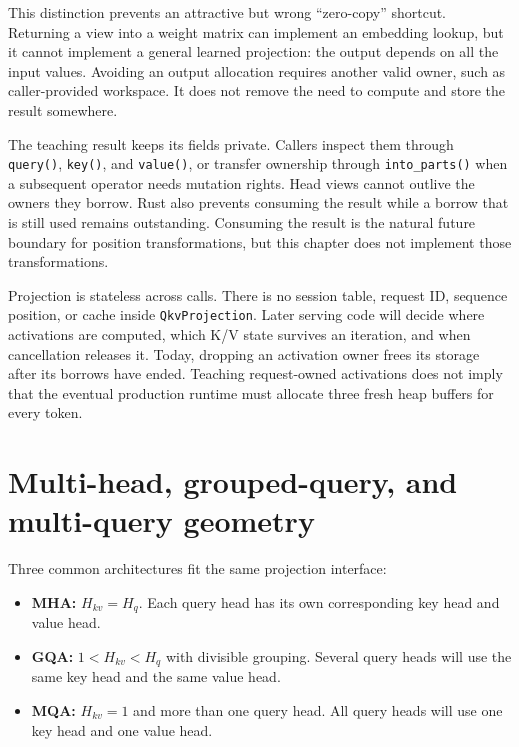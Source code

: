 This distinction prevents an attractive but wrong ``zero-copy''
shortcut. Returning a view into a weight matrix can implement an
embedding lookup, but it cannot implement a general learned projection:
the output depends on all the input values. Avoiding an output
allocation requires another valid owner, such as caller-provided
workspace. It does not remove the need to compute and store the result
somewhere.

The teaching result keeps its fields private. Callers inspect them
through \texttt{query()}, \texttt{key()}, and \texttt{value()}, or
transfer ownership through \texttt{into\_parts()} when a subsequent
operator needs mutation rights. Head views cannot outlive the owners
they borrow. Rust also prevents consuming the result while a borrow that
is still used remains outstanding. Consuming the result is the natural
future boundary for position transformations, but this chapter does not
implement those transformations.

Projection is stateless across calls. There is no session table, request
ID, sequence position, or cache inside \texttt{QkvProjection}. Later
serving code will decide where activations are computed, which K/V state
survives an iteration, and when cancellation releases it. Today,
dropping an activation owner frees its storage after its borrows have
ended. Teaching request-owned activations does not imply that the
eventual production runtime must allocate three fresh heap buffers for
every token.

\section{Multi-head, grouped-query, and multi-query
geometry}\label{multi-head-grouped-query-and-multi-query-geometry}


Three common architectures fit the same projection interface:

\begin{itemize}
\tightlist
\item
  \textbf{MHA:} \(H_{kv}=H_q\). Each query head has its own
  corresponding key head and value head.
\item
  \textbf{GQA:} \(1<H_{kv}<H_q\) with divisible grouping. Several query
  heads will use the same key head and the same value head.
\item
  \textbf{MQA:} \(H_{kv}=1\) and more than one query head. All query
  heads will use one key head and one value head.
\end{itemize}

